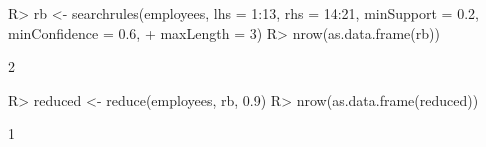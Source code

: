 \begin{Schunk}
% --begin: "reduce"
\begin{Sinput}
R> rb <- searchrules(employees, lhs = 1:13, rhs = 14:21, minSupport = 0.2, minConfidence = 0.6, 
+      maxLength = 3)
R> nrow(as.data.frame(rb))
\end{Sinput}
\begin{Soutput}
[1] 2
\end{Soutput}
\begin{Sinput}
R> reduced <- reduce(employees, rb, 0.9)
R> nrow(as.data.frame(reduced))
\end{Sinput}
\begin{Soutput}
[1] 1
\end{Soutput}
%
% --end: "reduce"
\end{Schunk}
